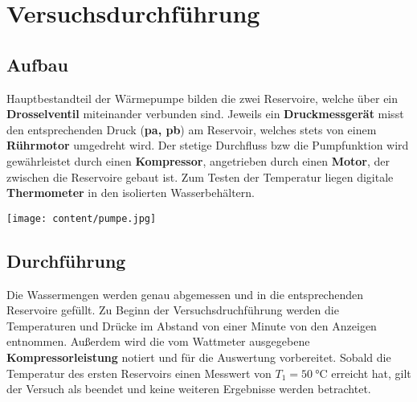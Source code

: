 \section{Versuchsdurchführung}
\label{sec:Versuchsdruchführung}


 


\noindent\begin{minipage}{0.5\textwidth}
\subsection{Aufbau}
\label{sec:Aufbau}
Hauptbestandteil der Wärmepumpe bilden die zwei Reservoire, welche über ein  \\
\textbf{Drosselventil} miteinander verbunden sind. Jeweils ein \textbf{Druckmessgerät} misst 
den entsprechenden Druck (\textbf{pa, pb}) am Reservoir, welches stets von einem \textbf{Rührmotor} umgedreht wird.
Der stetige Durchfluss bzw die Pumpfunktion wird gewährleistet durch einen \textbf{Kompressor}, angetrieben durch einen \textbf{Motor}, %
 der zwischen die Reservoire gebaut ist. Zum Testen der Temperatur liegen digitale 
\textbf{Thermometer} in den isolierten Wasserbehältern.
\end{minipage}
\hfill
\begin{minipage}{0.5\textwidth}\raggedleft
\vspace{2cm}
\texttt{[image: content/pumpe.jpg]}
\end{minipage}


\subsection{Durchführung}
\label{sec:Durchfuehrung}
Die Wassermengen werden genau abgemessen und in die entsprechenden Reservoire gefüllt. %
Zu Beginn der Versuchsdruchführung werden die Temperaturen und Drücke im Abstand von einer Minute von den Anzeigen entnommen. Außerdem wird die vom Wattmeter ausgegebene \textbf{Kompressorleistung} notiert und für 
die Auswertung vorbereitet. Sobald die Temperatur des ersten Reservoirs einen Messwert von $T_{1} = \SI{50}{\celsius}$ erreicht hat, gilt der Versuch als beendet und keine weiteren Ergebnisse werden betrachtet.
